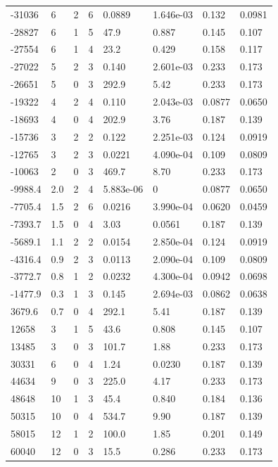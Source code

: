 \documentclass[preview]{standalone}
\begin{document}
{{\begin{tabular}{L{1.2cm}C{1.2cm} C{0.3cm}C{0.5cm} C{1.4cm}C{1.4cm} C{1.4cm}C{1.4cm}}
  -31036  &     6  & 2     &  6 &  0.0889  & 1.646e-03  & 0.132 &  0.0981   \\ 
  -28827  &     6  & 1     &  5 &  47.9  & 0.887  & 0.145 &  0.107   \\ 
  -27554  &     6  & 1     &  4 &  23.2  & 0.429  & 0.158 &  0.117   \\ 
  -27022  &     5  & 2     &  3 &  0.140  & 2.601e-03  & 0.233 &  0.173   \\ 
  -26651  &     5  & 0     &  3 &  292.9  & 5.42  & 0.233 &  0.173   \\ 
  -19322  &     4  & 2     &  4 &  0.110  & 2.043e-03  & 0.0877 &  0.0650   \\ 
  -18693  &     4  & 0     &  4 &  202.9  & 3.76  & 0.187 &  0.139   \\ 
  -15736  &     3  & 2     &  2 &  0.122  & 2.251e-03  & 0.124 &  0.0919   \\ 
  -12765  &     3  & 2     &  3 &  0.0221  & 4.090e-04  & 0.109 &  0.0809   \\ 
  -10063  &     2  & 0     &  3 &  469.7  & 8.70  & 0.233 &  0.173   \\ 
  -9988.4  &   2.0  & 2     &  4 &  5.883e-06  & 0  & 0.0877 &  0.0650   \\ 
  -7705.4  &   1.5  & 2     &  6 &  0.0216  & 3.990e-04  & 0.0620 &  0.0459   \\ 
  -7393.7  &   1.5  & 0     &  4 &  3.03  & 0.0561  & 0.187 &  0.139   \\ 
  -5689.1  &   1.1  & 2     &  2 &  0.0154  & 2.850e-04  & 0.124 &  0.0919   \\ 
  -4316.4  &   0.9  & 2     &  3 &  0.0113  & 2.090e-04  & 0.109 &  0.0809   \\ 
  -3772.7  &   0.8  & 1     &  2 &  0.0232  & 4.300e-04  & 0.0942 &  0.0698   \\ 
  -1477.9  &   0.3  & 1     &  3 &  0.145  & 2.694e-03  & 0.0862 &  0.0638   \\ 
  3679.6  &   0.7  & 0     &  4 &  292.1  & 5.41  & 0.187 &  0.139   \\ 
  12658  &     3  & 1     &  5 &  43.6  & 0.808  & 0.145 &  0.107   \\ 
  13485  &     3  & 0     &  3 &  101.7  & 1.88  & 0.233 &  0.173   \\ 
  30331  &     6  & 0     &  4 &  1.24  & 0.0230  & 0.187 &  0.139   \\ 
  44634  &     9  & 0     &  3 &  225.0  & 4.17  & 0.233 &  0.173   \\ 
  48648  &    10  & 1     &  3 &  45.4  & 0.840  & 0.184 &  0.136   \\ 
  50315  &    10  & 0     &  4 &  534.7  & 9.90  & 0.187 &  0.139   \\ 
  58015  &    12  & 1     &  2 &  100.0  & 1.85  & 0.201 &  0.149   \\ 
  60040  &    12  & 0     &  3 &  15.5  & 0.286  & 0.233 &  0.173   \\ 
\hline 
\end{tabular} 

}}
\end{document}
